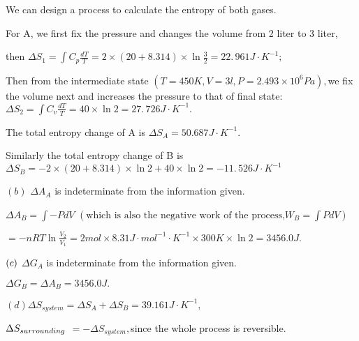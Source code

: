 \documentclass{ctexart}
\begin{document}
We can design a process to calculate the entropy of both gases.

For A, we first fix the pressure and changes the volume from 2 liter to 3
liter,

then $\Delta S_{1}=\int C_{p}\frac{dT}{T}=2\times \left( 20+8.314\right)
\times \ln \frac{3}{2}=\allowbreak 22.\,\allowbreak 961\unit{J}\cdot \unit{K}%
^{-1};$

Then from the intermediate state $\left( T=450\unit{K},V=3\unit{l}%
,P=2.493\times 10^{6}\unit{Pa}\right) ,$we fix the volume next and increases
the pressure to that of final state: $\Delta S_{2}=\int C_{v}\frac{dT}{T}%
=40\times \ln 2=\allowbreak 27.\,\allowbreak 726\unit{J}\cdot \unit{K}^{-1}.$

The total entropy change of A is $\allowbreak \Delta S_{A}=50.687\unit{J}%
\cdot \unit{K}^{-1}.$

Similarly the total entropy change of B is $\Delta S_{B}=-2\times \left(
20+8.314\right) \times \ln 2+40\times \ln 2=\allowbreak -11.\,\allowbreak 526%
\unit{J}\cdot \unit{K}^{-1}$

$\left( b\right) $ $\Delta A_{A}$ is indeterminate from the information
given. 

$\Delta A_{B}=\int -PdV$ $\left( \text{which is also the negative work of
the process,}W_{B}=\int PdV\right) $

$=-nRT\ln \frac{V_{2}}{V_{1}}=2\unit{mol}\times 8.31\unit{J}\cdot \unit{mol}%
^{-1}\cdot \unit{K}^{-1}\times 300\unit{K}\times \ln 2=\allowbreak 3456.0%
\unit{J}.$

$\bigskip \left( c\right) $ $\Delta G_{A}$ is indeterminate from the
information given. 

$\Delta G_{B}=\Delta A_{B}=\allowbreak 3456.0\unit{J}.$

$\left( d\right) \Delta S_{system}=\Delta S_{A}+\Delta S_{B}=39.161\unit{J}%
\cdot \unit{K}^{-1},$

$\bigskip \Delta S_{surrounding}$ $=-\Delta S_{system},$since the whole
process is reversible.
\end{document}
